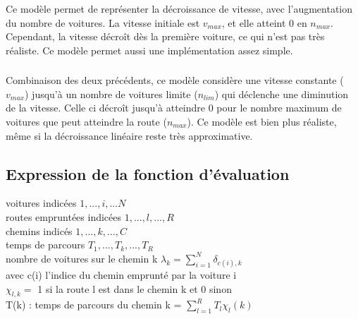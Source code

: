 \documentclass{article}
\newcommand {\axes}[4] {\draw[->] (0,0) -- (#3,0) node [right]{#1};\draw[->] (0,0) -- (0,#4) node[above]{#2};}
\newcommand {\valx}[2] {\draw (#1,0.03) -- (#1,-0.03) node[anchor=north]{#2};}
\newcommand {\valy}[2] {\draw (0.03,#1) -- (-0.03,#1) node[anchor=east]{#2};}
\begin{document}
\subsubsection{}

Ce modèle permet de représenter la décroissance de vitesse, avec l’augmentation du nombre de voitures. La vitesse initiale est $v_{max}$, et elle atteint 0 en $n_{max}$. Cependant, la vitesse décroît dès la première voiture, ce qui n’est pas très réaliste. Ce modèle permet aussi une implémentation assez simple.


\subsubsection{}

Combinaison des deux précédents, ce modèle considère une vitesse constante ($v_{max}$) jusqu’à un nombre de voitures limite ($n_{lim}$) qui déclenche une diminution de la vitesse. Celle ci décroît jusqu’à atteindre 0 pour le nombre maximum de voitures que peut atteindre la route ($n_{max}$). Ce modèle est bien plus réaliste, même si la décroissance linéaire reste très approximative.

\subsubsection{}
\newpage

\newpage
\subsection{Expression de la fonction d'évaluation}
voitures indicées $1,...,i,...N$\\
routes empruntées indicées $1,...,l,...,R$\\
chemins indicés $1,...,k,...,C$\\
temps de parcours $T_1,...,T_k,...,T_R$\\
nombre de voitures sur le chemin k $\lambda_k = \sum_{i=1}^N 
\delta_{c(i),k}$\\
avec c(i) l'indice du chemin emprunté par la voiture i\\
$\chi_{l,k} = $ 1 si la route l est dans le chemin k et 0 sinon\\
T(k) : temps de parcours du chemin k = $\sum_{l=1}^R T_l \chi_l (k)$
\end{document}
